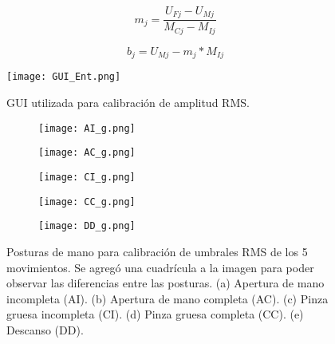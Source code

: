 
\vfill
\begin{equation}
	m_{j} = \frac{ U_{Fj} - U_{Mj} }{ M_{Cj} - M_{Ij} }
	\label{Ecu: m}
\end{equation}

\vfill
\begin{equation}
	b_{j} = U_{Mj} - m_{j}*M_{Ij}
	\label{Ecu: b}
\end{equation}

\vfill
\begin{figure}[htb]
	\centering
	\texttt{[image: GUI\_Ent.png]}
	\caption{GUI utilizada para calibración de amplitud RMS.}
	\label{Figura: GUI_Ent}
\end{figure}

\begin{figure}[htbp]
	\centering
	\begin{subfigure}[htbp]{0.4\textwidth}
		\texttt{[image: AI\_g.png]}
		\caption{}
		\label{Figura: AI}
	\end{subfigure}
	\begin{subfigure}[htbp]{0.4\textwidth}
		\texttt{[image: AC\_g.png]}
		\caption{}
		\label{Figura: AC}
	\end{subfigure}
	\newline
	\begin{subfigure}[htbp]{0.4\textwidth}
		\texttt{[image: CI\_g.png]}
		\caption{}
		\label{Figura: CI}
	\end{subfigure}
	\begin{subfigure}[htbp]{0.4\textwidth}
		\texttt{[image: CC\_g.png]}
		\caption{}
		\label{Figura: CC}
	\end{subfigure}
	\newline
	\begin{subfigure}[htbp]{0.4\textwidth}
		\texttt{[image: DD\_g.png]}
		\caption{}
		\label{Figura: DD}
	\end{subfigure}
	\caption[Posturas de mano para calibración de umbrales RMS]{Posturas de mano para calibración de umbrales RMS de los 5 movimientos. Se agregó una cuadrícula a la imagen para poder observar las diferencias entre las posturas. (a) Apertura de mano incompleta (AI). (b) Apertura de mano completa (AC). (c) Pinza gruesa incompleta (CI). (d) Pinza gruesa completa (CC). (e) Descanso (DD).}
	\label{Figura: Posturas}
\end{figure}

